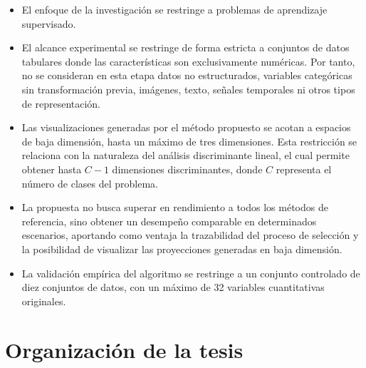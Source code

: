 \begin{itemize}
	
	\item El enfoque de la investigación se restringe a problemas de aprendizaje supervisado.
	
	\item El alcance experimental se restringe de forma estricta a conjuntos de datos tabulares donde las características son exclusivamente numéricas. Por tanto, no se consideran en esta etapa datos no estructurados, variables categóricas sin transformación previa, imágenes, texto, señales temporales ni otros tipos de representación.
	
	\item Las visualizaciones generadas por el método propuesto se acotan a espacios de baja dimensión, hasta un máximo de tres dimensiones. Esta restricción se relaciona con la naturaleza del análisis discriminante lineal, el cual permite obtener hasta $C - 1$ dimensiones discriminantes, donde $C$ representa el número de clases del problema.
	
	\item La propuesta no busca superar en rendimiento a todos los métodos de referencia, sino obtener un desempeño comparable en determinados escenarios, aportando como ventaja la trazabilidad del proceso de selección y la posibilidad de visualizar las proyecciones generadas en baja dimensión.
	
	\item La validación empírica del algoritmo se restringe a un conjunto controlado de diez conjuntos de datos, con un máximo de 32 variables cuantitativas originales.
	
\end{itemize}

\section{Organización de la tesis}
\label{sec:Organización-Tesis}

